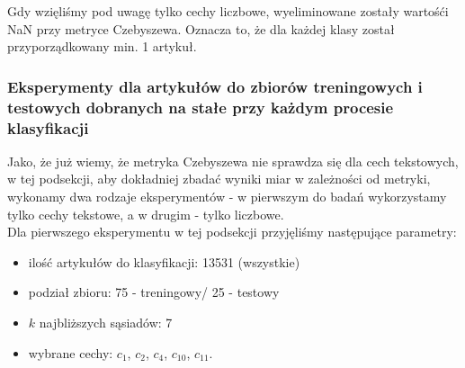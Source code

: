 \documentclass{classrep}
\begin{document}
Gdy wzięliśmy pod uwagę tylko cechy liczbowe, wyeliminowane zostały wartośći NaN przy metryce Czebyszewa. Oznacza to, że dla każdej klasy został przyporządkowany min. 1 artykuł.
\\
\subsubsection{Eksperymenty dla artykułów do zbiorów treningowych i testowych dobranych na stałe przy każdym procesie klasyfikacji}
Jako, że już wiemy, że metryka Czebyszewa nie sprawdza się dla cech tekstowych, w tej podsekcji, aby dokładniej zbadać wyniki miar w zależności od metryki, wykonamy dwa rodzaje eksperymentów - w pierwszym do badań wykorzystamy tylko cechy tekstowe, a w drugim - tylko liczbowe.\\
\indent Dla pierwszego eksperymentu w tej podsekcji przyjęliśmy następujące parametry:
\begin{itemize}
    \item ilość artykułów do klasyfikacji: 13531 (wszystkie)
    \item podział zbioru: 75 - treningowy/ 25 - testowy
    \item $k$ najbliższych sąsiadów: 7
    \item wybrane cechy: $c_1$, $c_2$, $c_4$, $c_{10}$, $c_{11}$.
\end{itemize}
\end{document}
